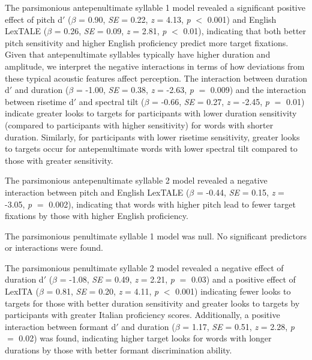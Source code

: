 The parsimonious antepenultimate syllable 1 model revealed a significant positive effect of pitch d$'$ ($\beta$ = 0.90, \textit{SE} = 0.22, \textit{z} = 4.13, \textit{p} $<$ 0.001) and English LexTALE ($\beta$ = 0.26, \textit{SE} = 0.09, \textit{z} = 2.81, \textit{p} $<$ 0.01), indicating that both better pitch sensitivity and higher English proficiency predict more target fixations. Given that antepenultimate syllables typically have higher duration and amplitude, we interpret the negative interactions in terms of how deviations from these typical acoustic features affect perception. The interaction between duration d$'$ and duration ($\beta$ = -1.00, \textit{SE} = 0.38, \textit{z} = -2.63, \textit{p} $=$ 0.009) and the interaction between risetime d$'$ and spectral tilt ($\beta$ = -0.66, \textit{SE} = 0.27, \textit{z} = -2.45, \textit{p} $=$ 0.01) indicate greater looks to targets for participants with lower duration sensitivity (compared to participants with higher sensitivity) for words with shorter duration. Similarly, for participants with lower risetime sensitivity, greater looks to targets occur for antepenultimate words with lower spectral tilt compared to those with greater sensitivity.

The parsimonious antepenultimate syllable 2 model revealed a negative interaction between pitch and English LexTALE ($\beta$ = -0.44, \textit{SE} = 0.15, \textit{z} = -3.05, \textit{p} $=$ 0.002), indicating that words with higher pitch lead to fewer target fixations by those with higher English proficiency. 

The parsimonious penultimate syllable 1 model was null. No significant predictors or interactions were found.

The parsimonious penultimate syllable 2 model revealed a negative effect of duration d$'$ ($\beta$ = -1.08, \textit{SE} = 0.49, \textit{z} = 2.21, \textit{p} $=$ 0.03) and a positive effect of LexITA ($\beta$ = 0.81, \textit{SE} = 0.20, \textit{z} = 4.11, \textit{p} $<$ 0.001) indicating fewer looks to targets for those with better duration sensitivity and greater looks to targets by participants with greater Italian proficiency scores. Additionally, a positive interaction between formant d$'$ and duration ($\beta$ = 1.17, \textit{SE} = 0.51, \textit{z} = 2.28, \textit{p} $=$ 0.02) was found, indicating higher target looks for words with longer durations by those with better formant discrimination ability. 


